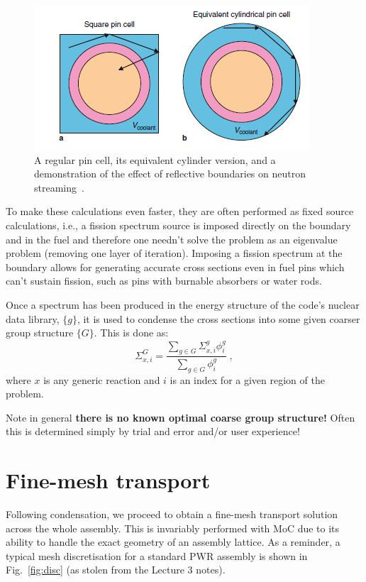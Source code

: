 \documentclass{article}
\begin{document}
\begin{figure}[h!]
	\centering
	\includegraphics[scale=0.95]{./images/cylinder.png} 
	\caption{A regular pin cell, its equivalent cylinder version, and a demonstration of the effect of reflective boundaries on neutron streaming~\cite{Knott}.} 
	\label{fig:cylinder}
\end{figure}

To make these calculations even faster, they are often performed as fixed source calculations, i.e., a fission spectrum source is imposed directly on the boundary and in the fuel and therefore one needn't solve the problem as an eigenvalue problem (removing one layer of iteration). Imposing a fission spectrum at the boundary allows for generating accurate cross sections even in fuel pins which can't sustain fission, such as pins with burnable absorbers or water rods.

Once a spectrum has been produced in the energy structure of the code's nuclear data library, $\{g\}$, it is used to condense the cross sections into some given coarser group structure $\{G\}$. This is done as:
\begin{equation}
    \Sigma^G_{x,i}=\frac{\sum_{g\in G}\Sigma^g_{x,i}\phi^g_i}{\sum_{g\in G}\phi^g_i}\;\mathrm{,}
\end{equation}
where $x$ is any generic reaction and $i$ is an index for a given region of the problem.

Note in general \textbf{there is no known optimal coarse group structure!} Often this is determined simply by trial and error and/or user experience!

\section{Fine-mesh transport}

Following condensation, we proceed to obtain a fine-mesh transport solution across the whole assembly. This is invariably performed with MoC due to its ability to handle the exact geometry of an assembly lattice. As a reminder, a typical mesh discretisation for a standard PWR assembly is shown in Fig.~\ref{fig:disc} (as stolen from the Lecture 3 notes).
\end{document}
